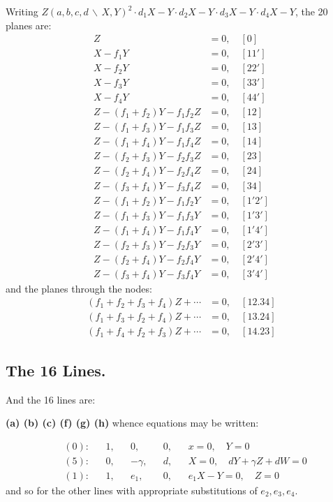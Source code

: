 \documentclass[11pt,a4paper]{article}
\begin{document}
Writing $Z(a,b,c,d \,\backslash\, X,Y)^2 \cdot d_1X - Y \cdot d_2X - Y \cdot d_3X - Y \cdot d_4X - Y$, the 20 planes are:
\begin{align*}
Z &= 0, \quad [0] \\
X - f_1Y &= 0, \quad [11'] \\
X - f_2Y &= 0, \quad [22'] \\
X - f_3Y &= 0, \quad [33'] \\
X - f_4Y &= 0, \quad [44'] \\
Z - (f_1 + f_2)Y - f_1f_2Z &= 0, \quad [12] \\
Z - (f_1 + f_3)Y - f_1f_3Z &= 0, \quad [13] \\
Z - (f_1 + f_4)Y - f_1f_4Z &= 0, \quad [14] \\
Z - (f_2 + f_3)Y - f_2f_3Z &= 0, \quad [23] \\
Z - (f_2 + f_4)Y - f_2f_4Z &= 0, \quad [24] \\
Z - (f_3 + f_4)Y - f_3f_4Z &= 0, \quad [34] \\
Z - (f_1 + f_2)Y - f_1f_2Y &= 0, \quad [1'2'] \\
Z - (f_1 + f_3)Y - f_1f_3Y &= 0, \quad [1'3'] \\
Z - (f_1 + f_4)Y - f_1f_4Y &= 0, \quad [1'4'] \\
Z - (f_2 + f_3)Y - f_2f_3Y &= 0, \quad [2'3'] \\
Z - (f_2 + f_4)Y - f_2f_4Y &= 0, \quad [2'4'] \\
Z - (f_3 + f_4)Y - f_3f_4Y &= 0, \quad [3'4']
\end{align*}
and the planes through the nodes:
\begin{align*}
(f_1 + f_2 + f_3 + f_4)Z + \cdots &= 0, \quad [12.34] \\
(f_1 + f_3 + f_2 + f_4)Z + \cdots &= 0, \quad [13.24] \\
(f_1 + f_4 + f_2 + f_3)Z + \cdots &= 0, \quad [14.23]
\end{align*}

\subsection*{The 16 Lines.}

And the 16 lines are:

\begin{center}
\textbf{(a) (b) (c) (f) (g) (h)} whence equations may be written:
\end{center}
\begin{align*}
&(0): && 1, && 0, && 0, && x = 0, \quad Y = 0 \\
&(5): && 0, && -\gamma, && d, && X = 0, \quad dY + \gamma Z + dW = 0 \\
&(1): && 1, && e_1, && 0, && e_1X - Y = 0, \quad Z = 0
\end{align*}
and so for the other lines with appropriate substitutions of $e_2, e_3, e_4$.
\end{document}
